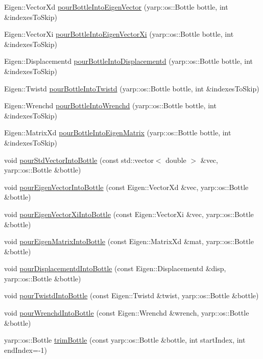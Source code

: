 \begin{DoxyCompactItemize}
\item 
Eigen\+::\+Vector\+Xd \hyperlink{namespaceocra_1_1util_a3fd47a8322cedd8f4e6417af69c1b350}{pour\+Bottle\+Into\+Eigen\+Vector} (yarp\+::os\+::\+Bottle bottle, int \&indexes\+To\+Skip)
\item 
Eigen\+::\+Vector\+Xi \hyperlink{namespaceocra_1_1util_a2bdcb149a446d1048692192e2ce82e9d}{pour\+Bottle\+Into\+Eigen\+Vector\+Xi} (yarp\+::os\+::\+Bottle bottle, int \&indexes\+To\+Skip)
\item 
Eigen\+::\+Displacementd \hyperlink{namespaceocra_1_1util_a39b8fa7b650ca10472587a7cf02ef5bf}{pour\+Bottle\+Into\+Displacementd} (yarp\+::os\+::\+Bottle bottle, int \&indexes\+To\+Skip)
\item 
Eigen\+::\+Twistd \hyperlink{namespaceocra_1_1util_af97e92d4d6f71f03338183e6f5ea1188}{pour\+Bottle\+Into\+Twistd} (yarp\+::os\+::\+Bottle bottle, int \&indexes\+To\+Skip)
\item 
Eigen\+::\+Wrenchd \hyperlink{namespaceocra_1_1util_a68e8e18301fe4f4167e8dee988df2d3c}{pour\+Bottle\+Into\+Wrenchd} (yarp\+::os\+::\+Bottle bottle, int \&indexes\+To\+Skip)
\item 
Eigen\+::\+Matrix\+Xd \hyperlink{namespaceocra_1_1util_ac8a4000b730a87cee5e5806134090be4}{pour\+Bottle\+Into\+Eigen\+Matrix} (yarp\+::os\+::\+Bottle bottle, int \&indexes\+To\+Skip)
\item 
void \hyperlink{namespaceocra_1_1util_abe236d2f67284737d18ea3f5913aacab}{pour\+Std\+Vector\+Into\+Bottle} (const std\+::vector$<$ double $>$ \&vec, yarp\+::os\+::\+Bottle \&bottle)
\item 
void \hyperlink{namespaceocra_1_1util_a6010148e34dccf066481599d26c575c9}{pour\+Eigen\+Vector\+Into\+Bottle} (const Eigen\+::\+Vector\+Xd \&vec, yarp\+::os\+::\+Bottle \&bottle)
\item 
void \hyperlink{namespaceocra_1_1util_a8dd17e44dac9cc815cfc9f009afc8633}{pour\+Eigen\+Vector\+Xi\+Into\+Bottle} (const Eigen\+::\+Vector\+Xi \&vec, yarp\+::os\+::\+Bottle \&bottle)
\item 
void \hyperlink{namespaceocra_1_1util_ac6e4695aa2be35591a1dc78eaf557c60}{pour\+Eigen\+Matrix\+Into\+Bottle} (const Eigen\+::\+Matrix\+Xd \&mat, yarp\+::os\+::\+Bottle \&bottle)
\item 
void \hyperlink{namespaceocra_1_1util_aa823d67f5ccb816d579756460867720f}{pour\+Displacementd\+Into\+Bottle} (const Eigen\+::\+Displacementd \&disp, yarp\+::os\+::\+Bottle \&bottle)
\item 
void \hyperlink{namespaceocra_1_1util_abfc4d8245c114e3ac49b4cbffe90851c}{pour\+Twistd\+Into\+Bottle} (const Eigen\+::\+Twistd \&twist, yarp\+::os\+::\+Bottle \&bottle)
\item 
void \hyperlink{namespaceocra_1_1util_a139674d4658e91e350b4d8704f38ab42}{pour\+Wrenchd\+Into\+Bottle} (const Eigen\+::\+Wrenchd \&wrench, yarp\+::os\+::\+Bottle \&bottle)
\item 
yarp\+::os\+::\+Bottle \hyperlink{namespaceocra_1_1util_a1cf3abfc2f03c824eb23f3881acfc7de}{trim\+Bottle} (const yarp\+::os\+::\+Bottle \&bottle, int start\+Index, int end\+Index=-\/1)
\end{DoxyCompactItemize}


